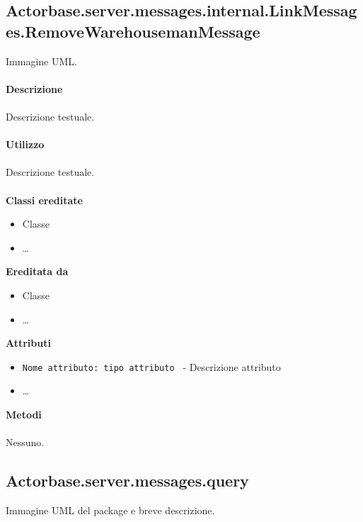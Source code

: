 \documentclass[a4paper]{article}
\begin{document}
	\subsection{Actorbase.server.messages.internal.LinkMessages.RemoveWarehousemanMessage}
		Immagine UML.
		\\ \\
		\textbf{Descrizione}
			\\ \\
			Descrizione testuale.
			\\ \\
		\textbf{Utilizzo}
			\\ \\
			Descrizione testuale.
			\\ \\
		\textbf{Classi ereditate}
			\begin{itemize}
				\item Classe
				\item \dots
			\end{itemize}
		\textbf{Ereditata da}
			\begin{itemize}
				\item Classe
				\item \dots
			\end{itemize}
		\textbf{Attributi}
			\begin{itemize}
				\item \texttt{Nome attributo: tipo attributo } - Descrizione attributo
				\item \dots
			\end{itemize}
		\textbf{Metodi}
			\\ \\
			Nessuno.
			
	\subsection{Actorbase.server.messages.query}
		Immagine UML del package e breve descrizione.
		
\end{document}
